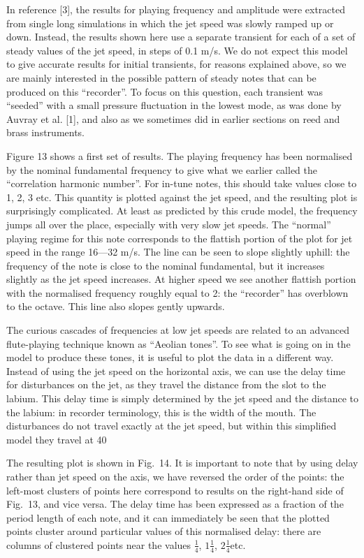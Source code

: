   In reference [3], the results for playing frequency and amplitude were 
  extracted from single long simulations in which the jet speed was slowly 
  ramped up or down. Instead, the results shown here use a separate transient 
  for each of a set of steady values of the jet speed, in steps of 0.1 m/s. We 
  do not expect this model to give accurate results for initial transients, for 
  reasons explained above, so we are mainly interested in the possible pattern 
  of steady notes that can be produced on this ``recorder''. To focus on this 
  question, each transient was “seeded” with a small pressure fluctuation in 
  the lowest mode, as was done by Auvray et al. [1], and also as we sometimes 
  did in earlier sections on reed and brass instruments. 

  Figure 13 shows a first set of results. The playing frequency has been 
  normalised by the nominal fundamental frequency to give what we earlier 
  called the “correlation harmonic number”. For in-tune notes, this should take 
  values close to 1, 2, 3 etc. This quantity is plotted against the jet speed, 
  and the resulting plot is surprisingly complicated. At least as predicted by 
  this crude model, the frequency jumps all over the place, especially with 
  very slow jet speeds. The “normal” playing regime for this note corresponds 
  to the flattish portion of the plot for jet speed in the range 16—32 m/s. The 
  line can be seen to slope slightly uphill: the frequency of the note is close 
  to the nominal fundamental, but it increases slightly as the jet speed 
  increases. At higher speed we see another flattish portion with the 
  normalised frequency roughly equal to 2: the “recorder” has overblown to the 
  octave. This line also slopes gently upwards. 

  The curious cascades of frequencies at low jet speeds are related to an 
  advanced flute-playing technique known as “Aeolian tones”. To see what is 
  going on in the model to produce these tones, it is useful to plot the data 
  in a different way. Instead of using the jet speed on the horizontal axis, we 
  can use the delay time for disturbances on the jet, as they travel the 
  distance from the slot to the labium. This delay time is simply determined by 
  the jet speed and the distance to the labium: in recorder terminology, this 
  is the width of the mouth. The disturbances do not travel exactly at the jet 
  speed, but within this simplified model they travel at 40%

  The resulting plot is shown in Fig.\ 14. It is important to note that by 
  using delay rather than jet speed on the axis, we have reversed the order of 
  the points: the left-most clusters of points here correspond to results on 
  the right-hand side of Fig.\ 13, and vice versa. The delay time has been 
  expressed as a fraction of the period length of each note, and it can 
  immediately be seen that the plotted points cluster around particular values 
  of this normalised delay: there are columns of clustered points near the 
  values $\frac{1}{4}$, $1 \frac{1}{4}$, $2 \frac{1}{4}$etc. 

